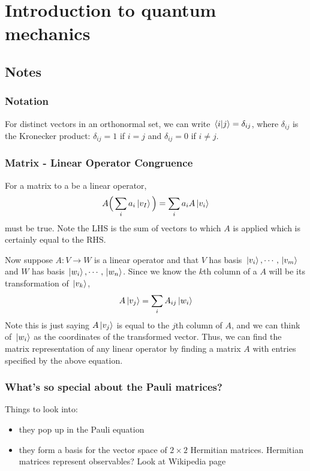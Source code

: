 \chapter{Introduction to quantum mechanics}

\section{Notes}

\subsection{Notation}

For distinct vectors in an orthonormal set, we can write $\braket*{i}{j} = \delta_{ij}$, where $\delta_{ij}$ is the Kronecker product: $\delta_{ij} = 1$ if $i = j$ and $\delta_{ij} = 0$ if $i \neq j$. 

\subsection{Matrix - Linear Operator Congruence}

For a matrix to a be a linear operator, 
$$A \Big( \sum_{i} a_{i} \ket*{v_{I}} \Big) = \sum_{i} a_{i} A \ket*{v_{i}}$$
must be true. Note the LHS is the sum of vectors to which $A$ is applied which is certainly equal to the RHS. 

Now suppose $A: V \rightarrow W$ is a linear operator and that $V$ has basis $\ket*{v_{i}}, \cdots, \ket*{v_{m}}$ and $W$ has basis $\ket*{w_{i}}, \cdots, \ket*{w_{n}}$. Since we know the $k$th column of a $A$ will be its transformation of $\ket*{v_{k}}$, 
$$A \ket*{v_{j}} = \sum_{i} A_{ij} \ket*{w_{i}}$$
Note this is just saying $A \ket*{v_{j}}$ is equal to the $j$th column of $A$, and we can think of $\ket*{w_{i}}$ as the coordinates of the transformed vector. Thus, we can find the matrix representation of any linear operator by finding a matrix $A$ with entries specified by the above equation. 

\subsection{What's so special about the Pauli matrices?}

Things to look into: \begin{itemize}
\item they pop up in the Pauli equation 
\item they form a basis for the vector space of $2 \times 2$ Hermitian matrices. Hermitian matrices represent observables? Look at Wikipedia page
\end{itemize}

